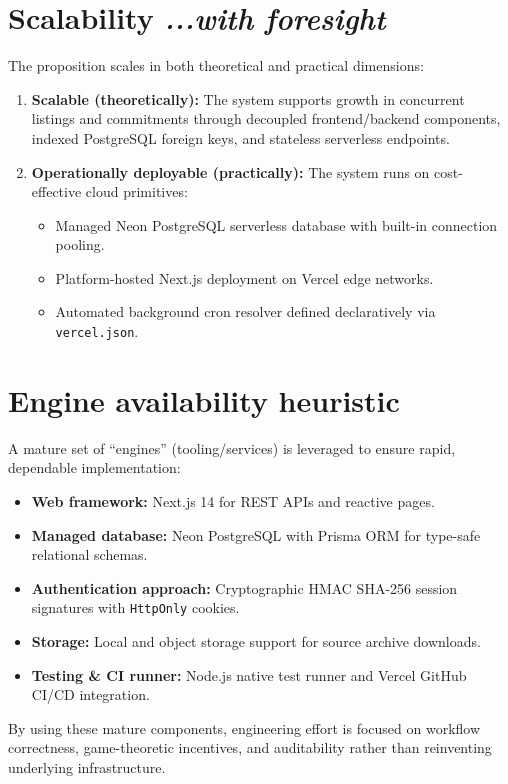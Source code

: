 \documentclass[11pt,a4paper]{article}
\begin{document}
\section{Scalability \hfill \normalfont\small\textit{...with foresight}}
The proposition scales in both theoretical and practical dimensions:
\begin{enumerate}
    \item \textbf{Scalable (theoretically):} The system supports growth in concurrent listings and commitments through decoupled frontend/backend components, indexed PostgreSQL foreign keys, and stateless serverless endpoints.
    \item \textbf{Operationally deployable (practically):} The system runs on cost-effective cloud primitives:
    \begin{itemize}
        \item Managed Neon PostgreSQL serverless database with built-in connection pooling.
        \item Platform-hosted Next.js deployment on Vercel edge networks.
        \item Automated background cron resolver defined declaratively via \texttt{vercel.json}.
    \end{itemize}
\end{enumerate}

\section{Engine availability heuristic}
A mature set of ``engines'' (tooling/services) is leveraged to ensure rapid, dependable implementation:
\begin{itemize}
    \item \textbf{Web framework:} Next.js 14 for REST APIs and reactive pages.
    \item \textbf{Managed database:} Neon PostgreSQL with Prisma ORM for type-safe relational schemas.
    \item \textbf{Authentication approach:} Cryptographic HMAC SHA-256 session signatures with \texttt{HttpOnly} cookies.
    \item \textbf{Storage:} Local and object storage support for source archive downloads.
    \item \textbf{Testing \& CI runner:} Node.js native test runner and Vercel GitHub CI/CD integration.
\end{itemize}
By using these mature components, engineering effort is focused on workflow correctness, game-theoretic incentives, and auditability rather than reinventing underlying infrastructure.
\end{document}
